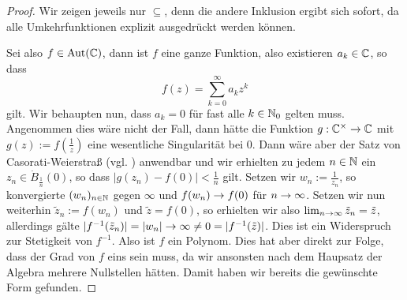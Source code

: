 \begin{proof}
  Wir zeigen jeweils nur $\subseteq$, denn die andere Inklusion ergibt
  sich sofort, da alle Umkehrfunktionen explizit ausgedrückt werden
  können.

  Sei also $f \in \operatorname{Aut}(\mathbb{C})$, dann ist $f$ eine ganze Funktion, also
  existieren $a_k \in \mathbb{C}$, so dass
  \[
  f(z) = \sum_{k=0}^\infty a_k z^k
  \]
  gilt. Wir behaupten nun, dass $a_k = 0$ für fast alle $k \in \mathbb{N}_0$
  gelten muss. Angenommen dies wäre nicht der Fall, dann hätte die
  Funktion $g: \mathbb{C}^\times \rightarrow \mathbb{C}$ mit $g(z) := f(\frac{1}{z})$ eine
  wesentliche Singularität bei $0$. Dann wäre aber der Satz von
  Casorati-Weierstraß (vgl. \cite[Satz 6.11]{Kas}) anwendbar und wir
  erhielten zu jedem $n \in \mathbb{N}$
  ein $z_n \in \dot B_{\frac{1}{n}}(0)$, so dass $|g(z_n) - f(0)| <
  \frac{1}{n}$ gilt. Setzen wir $w_n := \frac{1}{z_n}$, so konvergierte
  $(w_n)_{n \in \mathbb{N}}$ gegen $\infty$ und $f(w_n) \rightarrow f(0)$ für $n \rightarrow
  \infty$. Setzen wir nun weiterhin $\tilde z_n := f(w_n)$ und $\tilde
  z = f(0)$, so erhielten wir also $\lim_{n \rightarrow \infty} \tilde z_n =
  \tilde z$, allerdings gälte $|f^{-1}(\tilde z_n)| = |w_n| \rightarrow \infty
  \neq 0 = |f^{-1}(\tilde z)|$. Dies ist ein Widerspruch zur
  Stetigkeit von $f^{-1}$. Also ist $f$ ein Polynom. Dies hat aber
  direkt zur Folge, dass der Grad von $f$ eins sein muss, da wir
  ansonsten nach dem Haupsatz der Algebra mehrere Nullstellen
  hätten. Damit haben wir bereits die gewünschte Form gefunden.


\end{proof}
